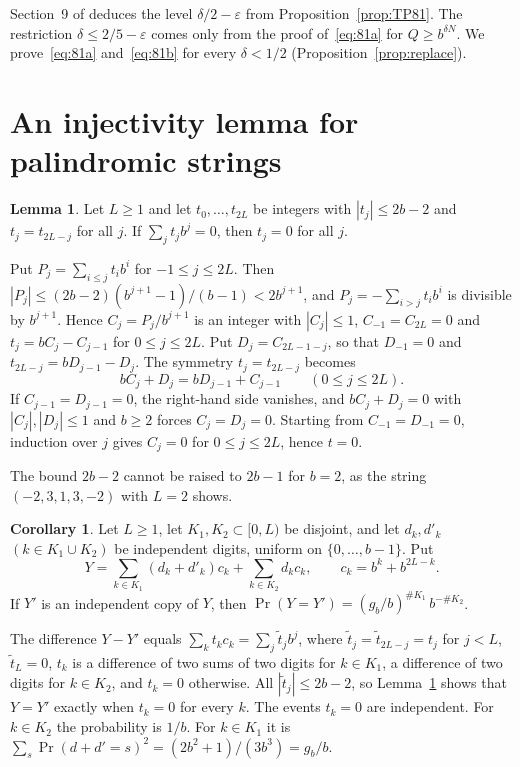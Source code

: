 \documentclass[11pt]{amsart}
\makeatletter
\theoremstyle{definition}
\newtheorem{lemma}[theorem]{Lemma}
\newtheorem{corollary}[theorem]{Corollary}
\numberwithin{equation}{section}
\renewenvironment{proof}[1][\proofname]{\par\pushQED{\qed}\normalfont\topsep6\p@\@plus6\p@\relax\trivlist\item[\hskip\labelsep\upshape#1.]\ignorespaces}{\popQED\endtrivlist\@endpefalse}
\makeatother
\begin{document}
Section~9 of \cite{TP} deduces the level $\delta/2-\varepsilon$ from Proposition~\ref{prop:TP81}. The restriction $\delta\le2/5-\varepsilon$ comes only from the proof of~\eqref{eq:81a} for $Q\ge b^{\delta N}$. We prove~\eqref{eq:81a} and~\eqref{eq:81b} for every $\delta<1/2$ (Proposition~\ref{prop:replace}).

\section{An injectivity lemma for palindromic strings}\label{sec:inj}

\begin{lemma}\label{lem:inj}
Let $L\ge1$ and let $t_0,\dots,t_{2L}$ be integers with $|t_j|\le 2b-2$ and $t_j=t_{2L-j}$ for all $j$. If $\sum_{j}t_jb^j=0$, then $t_j=0$ for all $j$.
\end{lemma}

\begin{proof}
Put $P_j=\sum_{i\le j}t_ib^i$ for $-1\le j\le 2L$. Then $|P_j|\le(2b-2)(b^{j+1}-1)/(b-1)<2b^{j+1}$, and $P_j=-\sum_{i>j}t_ib^i$ is divisible by $b^{j+1}$. Hence $C_j=P_j/b^{j+1}$ is an integer with $|C_j|\le1$, $C_{-1}=C_{2L}=0$ and $t_j=bC_j-C_{j-1}$ for $0\le j\le 2L$. Put $D_j=C_{2L-1-j}$, so that $D_{-1}=0$ and $t_{2L-j}=bD_{j-1}-D_j$. The symmetry $t_j=t_{2L-j}$ becomes
\[
bC_j+D_j=bD_{j-1}+C_{j-1}\qquad(0\le j\le 2L).
\]
If $C_{j-1}=D_{j-1}=0$, the right-hand side vanishes, and $bC_j+D_j=0$ with $|C_j|,|D_j|\le1$ and $b\ge2$ forces $C_j=D_j=0$. Starting from $C_{-1}=D_{-1}=0$, induction over $j$ gives $C_j=0$ for $0\le j\le 2L$, hence $t=0$.
\end{proof}

The bound $2b-2$ cannot be raised to $2b-1$ for $b=2$, as the string $(-2,3,1,3,-2)$ with $L=2$ shows.

\begin{corollary}\label{cor:collision}
Let $L\ge1$, let $K_1,K_2\subset[0,L)$ be disjoint, and let $d_k,d'_k$ $(k\in K_1\cup K_2)$ be independent digits, uniform on $\{0,\dots,b-1\}$. Put
\[
Y=\sum_{k\in K_1}(d_k+d'_k)c_k+\sum_{k\in K_2}d_kc_k,\qquad c_k=b^k+b^{2L-k}.
\]
If $Y'$ is an independent copy of $Y$, then $\Pr(Y=Y')=(g_b/b)^{\#K_1}\,b^{-\#K_2}$.
\end{corollary}

\begin{proof}
The difference $Y-Y'$ equals $\sum_kt_kc_k=\sum_j\tilde t_jb^j$, where $\tilde t_j=\tilde t_{2L-j}=t_j$ for $j<L$, $\tilde t_L=0$, $t_k$ is a difference of two sums of two digits for $k\in K_1$, a difference of two digits for $k\in K_2$, and $t_k=0$ otherwise. All $|\tilde t_j|\le2b-2$, so Lemma~\ref{lem:inj} shows that $Y=Y'$ exactly when $t_k=0$ for every $k$. The events $t_k=0$ are independent. For $k\in K_2$ the probability is $1/b$. For $k\in K_1$ it is $\sum_{s}\Pr(d+d'=s)^2=(2b^2+1)/(3b^3)=g_b/b$.
\end{proof}
\end{document}
